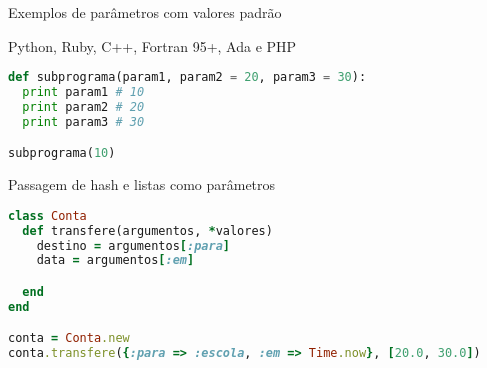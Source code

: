 \begin{frame}[fragile]{Exemplos de parâmetros com valores padrão}

Python, Ruby, C++, Fortran 95+, Ada e PHP

	\begin{lstlisting}[language=python]
def subprograma(param1, param2 = 20, param3 = 30):
  print param1 # 10
  print param2 # 20
  print param3 # 30

subprograma(10)

	\end{lstlisting}

\end{frame}

\begin{frame}[fragile]{Passagem de hash e listas como parâmetros}


	\begin{lstlisting}[language=ruby]
class Conta
  def transfere(argumentos, *valores)
    destino = argumentos[:para]
    data = argumentos[:em]

  end
end

conta = Conta.new
conta.transfere({:para => :escola, :em => Time.now}, [20.0, 30.0])


	\end{lstlisting}

\end{frame}

